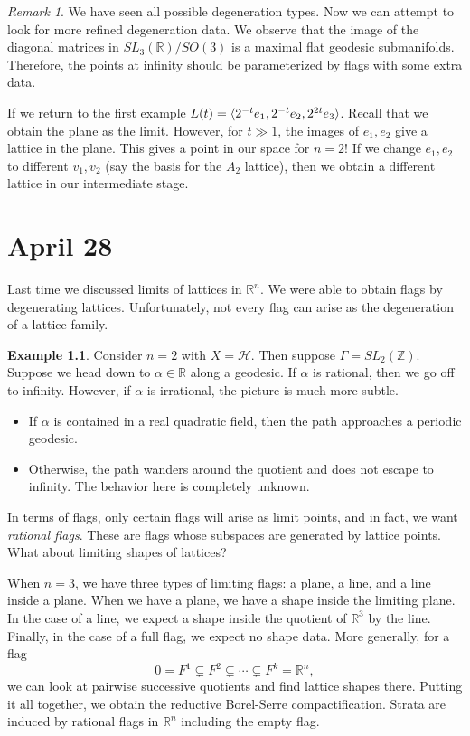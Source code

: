\documentclass[leqno, openany]{memoir}
\DeclarePairedDelimiter{\gen}{\langle}{\rangle}
\theoremstyle{definition}
\newtheorem{exm}[thm]{Example}
\theoremstyle{remark}
\newtheorem{rmk}[thm]{Remark}
\theoremstyle{plain}
\theoremstyle{definition}
\theoremstyle{remark}
\newcommand{\R}{\mathbb{R}}
\newcommand{\Z}{\mathbb{Z}}
\newcommand{\mc}[1]{\mathcal{#1}}
\begin{document}
\begin{rmk}
    We have seen all possible degeneration types. Now we can attempt to look for more refined degeneration data. We observe that the image of the diagonal matrices in $SL_3(\R) / SO(3)$ is a maximal flat geodesic submanifolds. Therefore, the points at infinity should be parameterized by flags with some extra data.
\end{rmk}

If we return to the first example $L(t) = \gen{2^{-t}e_1, 2^{-t}e_2, 2^{2t}e_3}$. Recall that we obtain the plane as the limit. However, for $t \gg 1$, the images of $e_1, e_2$ give a lattice in the plane. This gives a point in our space for $n=2$! If we change $e_1,e_2$ to different $v_1,v_2$ (say the basis for the $A_2$ lattice), then we obtain a different lattice in our intermediate stage.

\chapter{April 28}%
\label{cha:april_28}

Last time we discussed limits of lattices in $\R^n$. We were able to obtain flags by degenerating lattices. Unfortunately, not every flag can arise as the degeneration of a lattice family.

\begin{exm}
    Consider $n=2$ with $X = \mc{H}$. Then suppose $\Gamma = SL_2(\Z)$. Suppose we head down to $\alpha \in \R$ along a geodesic. If $\alpha$ is rational, then we go off to infinity. However, if $\alpha$ is irrational, the picture is much more subtle.
    \begin{itemize}
        \item If $\alpha$ is contained in a real quadratic field, then the path approaches a periodic geodesic.
        \item Otherwise, the path wanders around the quotient and does not escape to infinity. The behavior here is completely unknown.
    \end{itemize}
\end{exm}

In terms of flags, only certain flags will arise as limit points, and in fact, we want \textit{rational flags}. These are flags whose subspaces are generated by lattice points. What about limiting shapes of lattices?

When $n=3$, we have three types of limiting flags: a plane, a line, and a line inside a plane. When we have a plane, we have a shape inside the limiting plane. In the case of a line, we expect a shape inside the quotient of $\R^3$ by the line. Finally, in the case of a full flag, we expect no shape data. More generally, for a flag
\[ 0 = F^1 \subsetneq F^2 \subsetneq \cdots \subsetneq F^k = \R^n, \]
we can look at pairwise successive quotients and find lattice shapes there. Putting it all together, we obtain the reductive Borel-Serre compactification. Strata are induced by rational flags in $\R^n$ including the empty flag.
\end{document}
